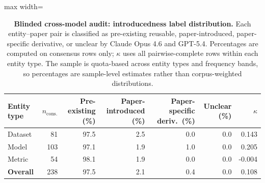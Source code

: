 \begin{table}[H]
\centering
\caption{\textbf{Blinded cross-model audit: introducedness label distribution.} Each entity--paper pair is classified as pre-existing reusable, paper-introduced, paper-specific derivative, or unclear by Claude Opus 4.6 and GPT-5.4. Percentages are computed on consensus rows only; $\kappa$ uses all pairwise-complete rows within each entity type. The sample is quota-based across entity types and frequency bands, so percentages are sample-level estimates rather than corpus-weighted distributions.}
\label{tab:annotation_introducedness}
\begin{adjustbox}{max width=\textwidth}
\begin{tabular}{l r rrrr r}
\toprule
Entity type & $n_{\mathrm{cons.}}$ & Pre-existing (\%) & Paper-introduced (\%) & Paper-specific deriv.\ (\%) & Unclear (\%) & $\kappa$ \\
\midrule
Dataset & 81 & 97.5 & 2.5 & 0.0 & 0.0 & 0.143 \\
Model & 103 & 97.1 & 1.9 & 1.0 & 0.0 & 0.205 \\
Metric & 54 & 98.1 & 1.9 & 0.0 & 0.0 & -0.004 \\
\textbf{Overall} & 238 & 97.5 & 2.1 & 0.4 & 0.0 & 0.108 \\
\bottomrule
\end{tabular}
\end{adjustbox}
\end{table}
